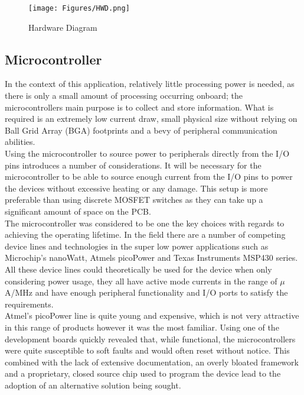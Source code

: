 \documentclass[12pt,openany,a4paper]{book}
\begin{document}
		\begin{figure}[H]
			\centering
			\texttt{[image: Figures/HWD.png]}
			\caption{Hardware Diagram}
			\label{fig:HWD}
		\end{figure}		

		
		\subsection{Microcontroller}
		In the context of this application, relatively little processing power is needed, as there is only a small amount of processing occurring onboard; the microcontrollers main purpose is to collect and store information. What is required is an extremely low current draw, small physical size without relying on Ball Grid Array (BGA) footprints and a bevy of peripheral communication abilities. \\
		
		Using the microcontroller to source power to peripherals directly from the I/O pins introduces a number of considerations. It will be necessary for the microcontroller to be able to source enough current from the I/O pins to power the devices without excessive heating or any damage. This setup is more preferable than using discrete MOSFET switches as they can take up a significant amount of space on the PCB. \\
				
		The microcontroller was considered to be one the key choices with regards to achieving the operating lifetime. In the field there are a number of competing device lines and technologies in the super low power applications such as Microchip's nanoWatt, Atmels picoPower and Texas Instruments MSP430 series. \\
		
		All these device lines could theoretically be used for the device when only considering power usage, they all have active mode currents in the range of $\mu$A/MHz and have enough peripheral functionality and I/O ports to satisfy the requirements. \\
		
		Atmel's picoPower line is quite young and expensive, which is not very attractive in this range of products however it was the most familiar. Using one of the development boards quickly revealed that, while functional, the microcontrollers were quite susceptible to soft faults and would often reset without notice. This combined with the lack of extensive documentation, an overly bloated framework and a proprietary, closed source chip used to program the device lead to the adoption of an alternative solution being sought. \\
		
\end{document}
